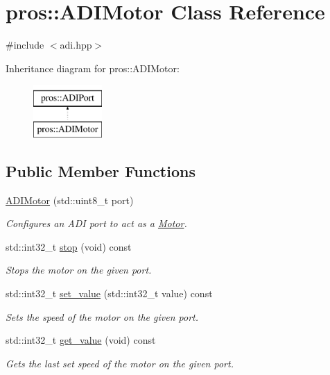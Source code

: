 \hypertarget{classpros_1_1ADIMotor}{}\section{pros\+::A\+D\+I\+Motor Class Reference}
\label{classpros_1_1ADIMotor}


{\ttfamily \#include $<$adi.\+hpp$>$}

Inheritance diagram for pros\+::A\+D\+I\+Motor\+:\begin{figure}[H]
\begin{center}
\leavevmode
\includegraphics[height=2.000000cm]{classpros_1_1ADIMotor}
\end{center}
\end{figure}
\subsection*{Public Member Functions}
\begin{DoxyCompactItemize}
\item 
\mbox{\hyperlink{classpros_1_1ADIMotor_afd2da0e8c53a8bc0c999d5232242069a}{A\+D\+I\+Motor}} (std\+::uint8\+\_\+t port)
\begin{DoxyCompactList}\small\item\em Configures an A\+DI port to act as a \mbox{\hyperlink{classpros_1_1Motor}{Motor}}. \end{DoxyCompactList}\item 
std\+::int32\+\_\+t \mbox{\hyperlink{classpros_1_1ADIMotor_ad8e9be8dfbc022e893a4d15996fe3bcd}{stop}} (void) const
\begin{DoxyCompactList}\small\item\em Stops the motor on the given port. \end{DoxyCompactList}\item 
std\+::int32\+\_\+t \mbox{\hyperlink{classpros_1_1ADIMotor_ae6711117fbceb3bb6e3602c4ef63aff1}{set\+\_\+value}} (std\+::int32\+\_\+t value) const
\begin{DoxyCompactList}\small\item\em Sets the speed of the motor on the given port. \end{DoxyCompactList}\item 
std\+::int32\+\_\+t \mbox{\hyperlink{classpros_1_1ADIMotor_ac79b5fd3ce67ae6ffc4b1fbbb306e997}{get\+\_\+value}} (void) const
\begin{DoxyCompactList}\small\item\em Gets the last set speed of the motor on the given port. \end{DoxyCompactList}\end{DoxyCompactItemize}


